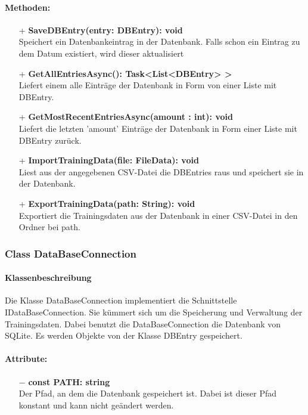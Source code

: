 \documentclass[a4paper,12pt]{article}
\begin{document}
	\paragraph{Methoden:}
	\begin{itemize}
		\item[+] \textbf{SaveDBEntry(entry: DBEntry): void}\\Speichert ein Datenbankeintrag in der \gls{Datenbank}. Falls schon ein Eintrag zu dem Datum existiert, wird dieser aktualisiert\\
		\item[+] \textbf{GetAllEntriesAsync(): Task<List<DBEntry> >}\\Liefert einem alle Einträge der Datenbank in Form von einer Liste mit DBEntry.\\ 
		\item[+] \textbf{GetMostRecentEntriesAsync(amount : int): void}\\Liefert  die letzten 'amount' Einträge der Datenbank in Form einer Liste mit DBEntry zurück.\\
		\item[+] \textbf{ImportTrainingData(file: FileData): void}\\Liest aus der angegebenen \gls{CSV}-Datei die DBEntries raus und speichert sie in der \gls{Datenbank}.\\
		\item[+] \textbf{ExportTrainingData(path: String): void}\\Exportiert die Trainingsdaten aus der \gls{Datenbank} in einer \gls{CSV}-Datei in den Ordner bei path. \\
	\end{itemize}

\subsubsection{Class DataBaseConnection}
	\paragraph{Klassenbeschreibung}
	Die Klasse DataBaseConnection implementiert die Schnittstelle IDataBaseConnection. Sie kümmert sich um die Speicherung und Verwaltung der Trainingsdaten. Dabei benutzt die DataBaseConnection die \gls{Datenbank} von SQLite. Es werden Objekte von der Klasse DBEntry gespeichert. 
	
	\paragraph{Attribute:}
	\begin{itemize}
		\item[$-$] \textbf{const PATH: string}\\Der Pfad, an dem die Datenbank gespeichert ist. Dabei ist dieser Pfad konstant und kann nicht geändert werden.
	\end{itemize}
\end{document}
